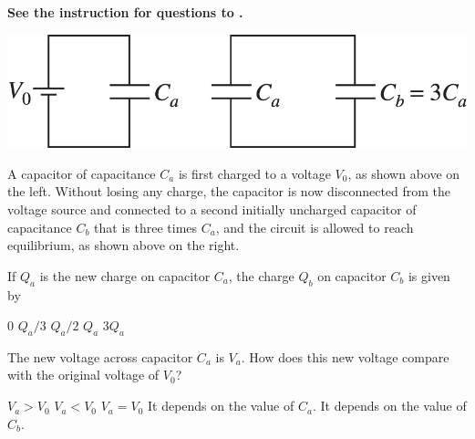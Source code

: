 
\textbf{See the instruction for questions  to .} 

\begin{center}
    \includegraphics[scale=0.3]{images/img-009-011.png}
\end{center}

A capacitor of capacitance $C_{a}$ is first charged to a voltage $V_{0}$, as shown above on the left. Without losing any charge, the capacitor is now disconnected from the voltage source and connected to a second initially uncharged capacitor of capacitance $C_{b}$ that is three times $C_{a}$, and the circuit is allowed to reach equilibrium, as shown above on the right. 

\begin{questions}
\setcounter{question}{18}

\question
If $Q_{a}$ is the new charge on capacitor $C_{a}$, the charge $Q_{b}$ on capacitor $C_{b}$ is given by

\begin{choices}
    \choice $0$
    \choice $Q_{a} / 3$
    \choice $Q_{a} / 2$
    \choice $Q_{a}$
    \choice $3 Q_{a}$
\end{choices}

\question
The new voltage across capacitor $C_{a}$ is $V_{a}$. How does this new voltage compare with the original voltage of $V_{0}$?

\begin{choices}
    \choice $V_{a} >V_{0}$ 
    \choice $V_{a} <V_{0}$ 
    \choice $V_{a} =V_{0}$
    \choice It depends on the value of $C_{a}$.
    \choice It depends on the value of $C_{b}$.
\end{choices}

\end{questions}
